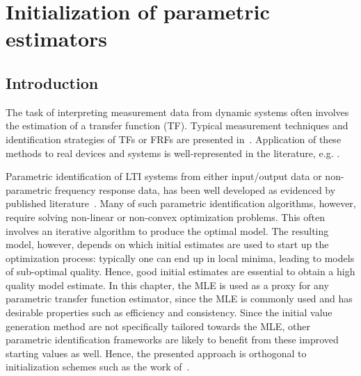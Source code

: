 \chapter{Initialization of parametric estimators}
\label{sec:initvals}
\gdef\thisDir{ch05-initvals}

\section{Introduction}
\label{se:introd}
The task of interpreting measurement data from dynamic systems often involves the estimation of a transfer function (TF). 
Typical measurement techniques and identification strategies of  \glspl{TF} or \glspl{FRF} are presented in~\citep{Schoukens1998,Schoukens2006LPM,Guillaume1996,Broersen1995,Pintelon2010LPM1,Antoni2007FRF}.
Application of these methods to real devices and systems is well-represented in the literature, e.g. \citep{Lim2010,Robinson1990,Behjat2010}.

Parametric identification of \gls{LTI} systems from either input/output data or non-parametric frequency response data, has been well developed as evidenced by published literature~\citep{Pintelon2012,Ljung1999,Schoukens1999,Pintelon1998}.
Many of such parametric identification algorithms, however, require solving non-linear or non-convex optimization problems.
This often involves an iterative algorithm to produce the optimal model.
 The resulting model, however, depends on which initial estimates are used to start up the optimization process: typically one can end up in local minima, leading to models of sub-optimal quality.
 Hence, good initial estimates are essential to obtain a high quality model estimate.
 In this chapter, the \gls{MLE} is used as a proxy for any parametric transfer function estimator, since the \gls{MLE} is commonly used and has desirable properties such as efficiency and consistency.
 Since the initial value generation method are not specifically tailored towards the \gls{MLE}, other parametric identification frameworks are likely to benefit from these improved starting values as well.
 Hence, the presented approach is orthogonal to initialization schemes such as the work of~\citet{vanHerpen2014}.

